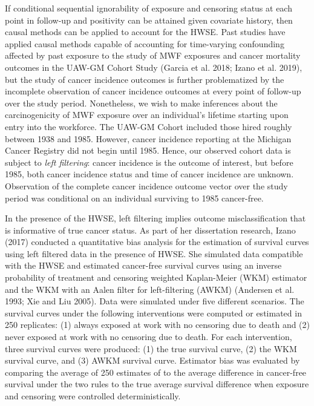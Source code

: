\documentclass[
  11pt,
]{article}
\begin{document}
If conditional sequential ignorability of exposure and censoring status
at each point in follow-up and positivity can be attained given
covariate history, then causal methods can be applied to account for the
HWSE. Past studies have applied causal methods capable of accounting for
time-varying confounding affected by past exposure to the study of MWF
exposures and cancer mortality outcomes in the UAW-GM Cohort Study
(Garcia et al. 2018; Izano et al. 2019), but the study of cancer
incidence outcomes is further problematized by the incomplete
observation of cancer incidence outcomes at every point of follow-up
over the study period. Nonetheless, we wish to make inferences about the
carcinogenicity of MWF exposure over an individual's lifetime starting
upon entry into the workforce. The UAW-GM Cohort included those hired
roughly between 1938 and 1985. However, cancer incidence reporting at
the Michigan Cancer Registry did not begin until 1985. Hence, our
observed cohort data is subject to \emph{left filtering}: cancer
incidence is the outcome of interest, but before 1985, both cancer
incidence status and time of cancer incidence are unknown. Observation
of the complete cancer incidence outcome vector over the study period
was conditional on an individual surviving to 1985 cancer-free.

In the presence of the HWSE, left filtering implies outcome
misclassification that is informative of true cancer status. As part of
her dissertation research, Izano (2017) conducted a quantitative bias
analysis for the estimation of survival curves using left filtered data
in the presence of HWSE. She simulated data compatible with the HWSE and
estimated cancer-free survival curves using an inverse probability of
treatment and censoring weighted Kaplan-Meier (WKM) estimator and the
WKM with an Aalen filter for left-filtering (AWKM) (Andersen et al.
1993; Xie and Liu 2005). Data were simulated under five different
scenarios. The survival curves under the following interventions were
computed or estimated in 250 replicates: (1) always exposed at work with
no censoring due to death and (2) never exposed at work with no
censoring due to death. For each intervention, three survival curves
were produced: (1) the true survival curve, (2) the WKM survival curve,
and (3) AWKM survival curve. Estimator bias was evaluated by comparing
the average of 250 estimates of to the average difference in cancer-free
survival under the two rules to the true average survival difference
when exposure and censoring were controlled deterministically.
\end{document}
